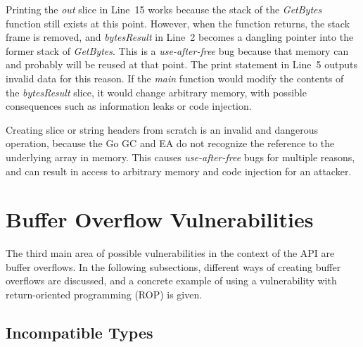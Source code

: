 Printing the \textit{out} slice in Line~15 works because the stack of the \textit{GetBytes} function still exists at
this point.
However, when the function returns, the stack frame is removed, and \textit{bytesResult} in Line~2 becomes a dangling
pointer into the former stack of \textit{GetBytes}.
This is a \textit{use-after-free} bug because that memory can and probably will be reused at that point.
The print statement in Line~5 outputs invalid data for this reason.
If the \textit{main} function would modify the contents of the \textit{bytesResult} slice, it would change arbitrary
memory, with possible consequences such as information leaks or code injection.

\begin{insight}
    Creating slice or string headers from scratch is an invalid and dangerous operation, because the Go \acrshort{GC}
    and \acrshort{EA} do not recognize the reference to the underlying array in memory.
    This causes \textit{use-after-free} bugs for multiple reasons, and can result in access to arbitrary memory and code
    injection for an attacker.
\end{insight}



\section{Buffer Overflow Vulnerabilities}\label{sec:unsafe-security-problems:buffer-overflow}

The third main area of possible vulnerabilities in the context of the \unsafe{} \acrshort{API} are buffer overflows.
In the following subsections, different ways of creating buffer overflows are discussed, and a concrete example of
using a vulnerability with return-oriented programming (\acrshort{ROP}) is given.



\subsection{Incompatible Types}\label{subsec:unsafe-security-problems:slice-casts:incompatible-types}


